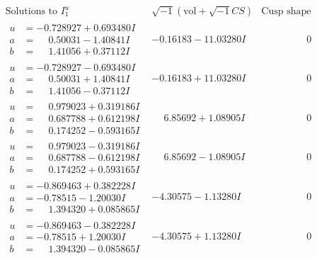 \documentclass[1p]{elsarticle_modified}
\theoremstyle{definition}
\newcommand{\I}{\sqrt{-1}}
\begin{document}
$$\begin{array}{c|c|c}  
\text{Solutions to }I^u_{1}& \I (\text{vol} + \sqrt{-1}CS) & \text{Cusp shape}\\
 \hline 
\begin{aligned}
u &= -0.728927 + 0.693480 I \\
a &= \phantom{-}0.50031 - 1.40841 I \\
b &= \phantom{-}1.41056 + 0.37112 I\end{aligned}
 & -0.16183 - 11.03280 I & \phantom{-0.000000 } 0 \\ \hline\begin{aligned}
u &= -0.728927 - 0.693480 I \\
a &= \phantom{-}0.50031 + 1.40841 I \\
b &= \phantom{-}1.41056 - 0.37112 I\end{aligned}
 & -0.16183 + 11.03280 I & \phantom{-0.000000 } 0 \\ \hline\begin{aligned}
u &= \phantom{-}0.979023 + 0.319186 I \\
a &= \phantom{-}0.687788 + 0.612198 I \\
b &= \phantom{-}0.174252 - 0.593165 I\end{aligned}
 & \phantom{-}6.85692 + 1.08905 I & \phantom{-0.000000 } 0 \\ \hline\begin{aligned}
u &= \phantom{-}0.979023 - 0.319186 I \\
a &= \phantom{-}0.687788 - 0.612198 I \\
b &= \phantom{-}0.174252 + 0.593165 I\end{aligned}
 & \phantom{-}6.85692 - 1.08905 I & \phantom{-0.000000 } 0 \\ \hline\begin{aligned}
u &= -0.869463 + 0.382228 I \\
a &= -0.78515 - 1.20030 I \\
b &= \phantom{-}1.394320 + 0.085865 I\end{aligned}
 & -4.30575 - 1.13280 I & \phantom{-0.000000 } 0 \\ \hline\begin{aligned}
u &= -0.869463 - 0.382228 I \\
a &= -0.78515 + 1.20030 I \\
b &= \phantom{-}1.394320 - 0.085865 I\end{aligned}
 & -4.30575 + 1.13280 I & \phantom{-0.000000 } 0 \\ \hline\begin{aligned}

\end{aligned}
\end{array}$$
\end{document}
